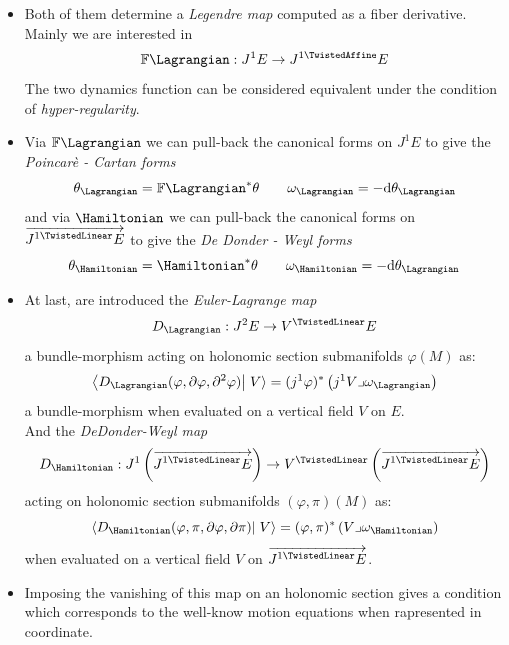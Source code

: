 \documentclass[a4paper,12pt]{scrartcl}  %
\renewcommand{\AffDualJet}{ J^{1 \TwistedAffine}E }
\renewcommand{\LinDualJet}{ \overrightarrow{J^{1 \TwistedLinear}E} }
\begin{document}
\begin{itemize}
\item Both of them determine a \emph{Legendre map} computed as a fiber derivative.
	Mainly we are interested  in
	\begin{displaymath}
		\mathbb{F} \Lagrangian : J^1 E \rightarrow \AffDualJet		
	\end{displaymath}
	The two dynamics function can be considered equivalent under the condition of \emph{hyper-regularity}\cite[chapter, p.~215]{Gimmsy}.

\item Via $\mathbb{F} \Lagrangian$ we can pull-back the canonical forms on $J^1 E$ to give the \emph{Poincarè - Cartan forms}
	\begin{displaymath}
		\theta_\Lagrangian = \mathbb{F} \Lagrangian^\ast \theta \qquad \omega_\Lagrangian = - \textrm{d} \theta_\Lagrangian
	\end{displaymath}
	and via $\Hamiltonian$ we can pull-back the canonical forms on $\LinDualJet$ to give the \emph{De Donder - Weyl forms}
	\begin{displaymath}
		\theta_\Hamiltonian = \Hamiltonian^\ast \theta \qquad \omega_\Hamiltonian = - \textrm{d} \theta_\Lagrangian
	\end{displaymath}
	
\item At last, are introduced the \emph{Euler-Lagrange map}
	\begin{displaymath}
		D_\Lagrangian : J^2 E \rightarrow V^\TwistedLinear E
	\end{displaymath}
	 a bundle-morphism acting on holonomic section submanifolds $\varphi(M)$ as:
	\begin{displaymath}
		\left\langle D_\Lagrangian(\varphi, \partial \varphi , \partial^2 \varphi) \right\vert \left. V \right\rangle = (j^1 \varphi)^\ast \left( j^1V \lrcorner \omega_\Lagrangian \right)
	\end{displaymath}
	 a bundle-morphism when evaluated on a vertical field $V$ on $E$. \\
	And the \emph{DeDonder-Weyl map}
	\begin{displaymath}
		D_\Hamiltonian : J^1\left(\LinDualJet \right) \rightarrow V^\TwistedLinear \left(\LinDualJet \right)
	\end{displaymath}
	acting on holonomic section submanifolds $(\varphi, \pi)(M)$ as:
	\begin{displaymath}
		\left\langle D_\Hamiltonian(\varphi, \pi, \partial \varphi , \partial \pi) \right\vert \left. V \right\rangle = (\varphi, \pi)^\ast \left( V \lrcorner \omega_\Hamiltonian \right)
	\end{displaymath}	
	when evaluated on a vertical field $V$ on $\LinDualJet$.
	
\item	
	Imposing the vanishing of this map on an holonomic section gives a condition which corresponds to the well-know motion equations when rapresented in coordinate.

\end{itemize}
\end{document}
